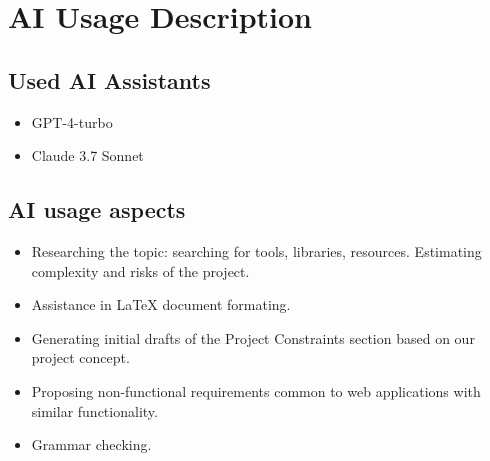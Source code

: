 \section{AI Usage Description}

\subsection{Used AI Assistants}

\begin{itemize}
    \item GPT-4-turbo
    \item Claude 3.7 Sonnet
\end{itemize}

\subsection{AI usage aspects}

\begin{itemize}

    \item Researching the topic: searching for tools, libraries, resources. Estimating complexity and risks of the project.
    \item Assistance in LaTeX document formating.
    \item Generating initial drafts of the Project Constraints section based
    on our project concept.
    \item Proposing non-functional requirements common to web applications with
    similar functionality.
    \item Grammar checking.

\end{itemize}



